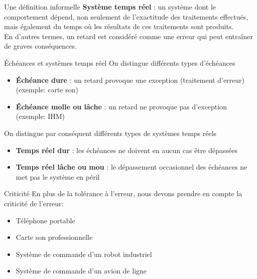 \begin{frame}{Une définition informelle}
  \textbf{Système  temps réel  }  : un  système  dont le  comportement
  dépend,  non seulement  de l'exactitude  des  traitements effectués,
  mais également
  du temps où les résultats de ces traitements sont produits.\\[3mm]

  En d'autres  termes, un  retard est considéré  comme une  erreur qui
  peut entraîner de graves  conséquences.

\end{frame}

\begin{frame}{Échéances et systèmes temps réel}
  On distingue différents types d'échéances
  \begin{itemize}
  \item  \textbf{Échéance dure}  :  un retard  provoque une  exception
    (traitement d'erreur) (exemple:  carte son)
  \item \textbf{Échéance molle  ou lâche} : un retard  ne provoque pas
    d'exception (exemple: IHM)
  \end{itemize}

  On distingue par conséquent différents types de systèmes temps réels
  \begin{itemize}
  \item \textbf{Temps  réel dur} :  les échéances ne doivent  en aucun
    cas  être  dépassées
  \item \textbf{Temps réel lâche  ou mou} : le dépassement occasionnel
    des échéances ne met pas  le système en péril
  \end{itemize}
\end{frame}

\begin{frame}{Criticité}
  En plus de la tolérance à l'erreur, nous devons prendre en compte la
  criticité de l'erreur:
  \begin{itemize}
  \item Téléphone portable
  \item Carte son professionnelle
  \item Système de commande d'un robot industriel
  \item Système de commande d'un avion de ligne
  \end{itemize}
\end{frame}

